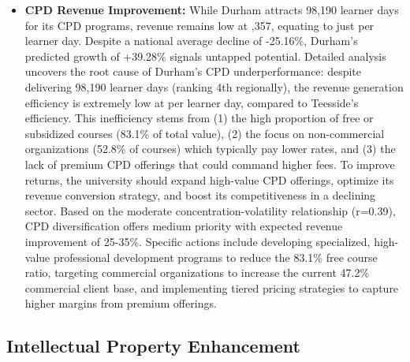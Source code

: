 \documentclass[journal,onecolumn, 10pt,draftclsnofoot]{IEEEtran}
\begin{document}
\begin{itemize}
    \item \textbf{CPD Revenue Improvement:} While Durham attracts 98,190 learner days for its CPD programs, revenue remains low at ,357, equating to just  per learner day. Despite a national average decline of -25.16\%, Durham's predicted growth of +39.28\% signals untapped potential. Detailed analysis uncovers the root cause of Durham's CPD underperformance: despite delivering 98,190 learner days (ranking 4th regionally), the revenue generation efficiency is extremely low at  per learner day, compared to Teesside's  efficiency. This inefficiency stems from (1) the high proportion of free or subsidized courses (83.1\% of total value), (2) the focus on non-commercial organizations (52.8\% of courses) which typically pay lower rates, and (3) the lack of premium CPD offerings that could command higher fees. To improve returns, the university should expand high-value CPD offerings, optimize its revenue conversion strategy, and boost its competitiveness in a declining sector. Based on the moderate concentration-volatility relationship (r=0.39), CPD diversification offers medium priority with expected revenue improvement of 25-35\%. Specific actions include developing specialized, high-value professional development programs to reduce the 83.1\% free course ratio, targeting commercial organizations to increase the current 47.2\% commercial client base, and implementing tiered pricing strategies to capture higher margins from premium offerings.
\end{itemize}

\subsection{Intellectual Property Enhancement}
\end{document}
